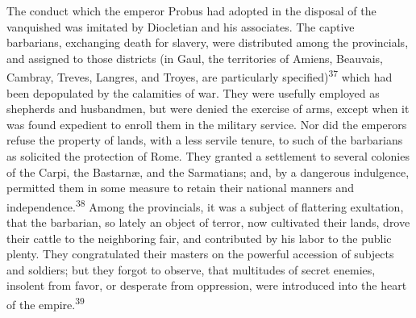 The conduct which the emperor Probus had adopted in the disposal
of the vanquished was imitated by Diocletian and his associates.
The captive barbarians, exchanging death for slavery, were
distributed among the provincials, and assigned to those
districts (in Gaul, the territories of Amiens, Beauvais, Cambray,
Treves, Langres, and Troyes, are particularly specified)\textsuperscript{37} which
had been depopulated by the calamities of war. They were usefully
employed as shepherds and husbandmen, but were denied the
exercise of arms, except when it was found expedient to enroll
them in the military service. Nor did the emperors refuse the
property of lands, with a less servile tenure, to such of the
barbarians as solicited the protection of Rome. They granted a
settlement to several colonies of the Carpi, the Bastarnæ, and
the Sarmatians; and, by a dangerous indulgence, permitted them in
some measure to retain their national manners and independence.\textsuperscript{38}
Among the provincials, it was a subject of flattering
exultation, that the barbarian, so lately an object of terror,
now cultivated their lands, drove their cattle to the neighboring
fair, and contributed by his labor to the public plenty. They
congratulated their masters on the powerful accession of subjects
and soldiers; but they forgot to observe, that multitudes of
secret enemies, insolent from favor, or desperate from
oppression, were introduced into the heart of the empire.\textsuperscript{39}




